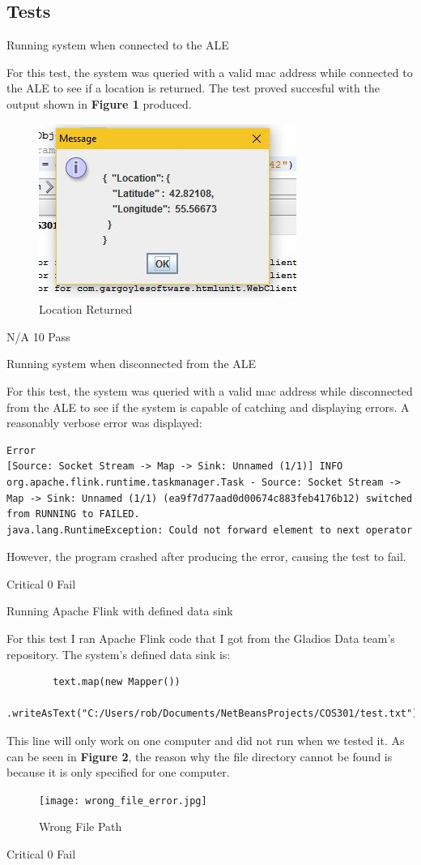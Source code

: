\subsection{Tests}

\FuncReq
{Running system when connected to the ALE}
{For this test, the system was queried with a valid mac address while connected to the ALE to see if a location is returned. The test proved succesful with the output shown in \textbf{Figure 1} produced.
			\begin{figure}[h]
				\centering
				\includegraphics{functional/images/right_mac.jpg}
				\caption{Location Returned}
				\label{fig:LocationReturned}
			\end{figure}
}
{N/A}
{10}
{Pass}

\FuncReq
{Running system when disconnected from the ALE}
{For this test, the system was queried with a valid mac address while disconnected from the ALE to see if the system is capable of catching and displaying errors. A reasonably verbose error was displayed: 
\begin{verbatim}
Error
[Source: Socket Stream -> Map -> Sink: Unnamed (1/1)] INFO org.apache.flink.runtime.taskmanager.Task - Source: Socket Stream -> Map -> Sink: Unnamed (1/1) (ea9f7d77aad0d00674c883feb4176b12) switched from RUNNING to FAILED.
java.lang.RuntimeException: Could not forward element to next operator
\end{verbatim}
However, the program crashed after producing the error, causing the test to fail.
}
{Critical}
{0}
{Fail}

\FuncReq
{Running Apache Flink with defined data sink}
{For this test I ran Apache Flink code that I got from the Gladios Data team's repository.
 The system's defined data sink is:
	\begin{verbatim}
		text.map(new Mapper())
		.writeAsText("C:/Users/rob/Documents/NetBeansProjects/COS301/test.txt");
	\end{verbatim}
This line will only work on one computer and did not run when we tested it. As can be seen in \textbf{Figure 2}, the reason why the file directory cannot be found is because it is only specified for one computer.
			\begin{figure}[h]
				\centering
				\texttt{[image: wrong\_file\_error.jpg]}
				\caption{Wrong File Path}
				\label{fig:WrongFIlePath}
			\end{figure} 
}
{Critical}
{0}
{Fail}
		
